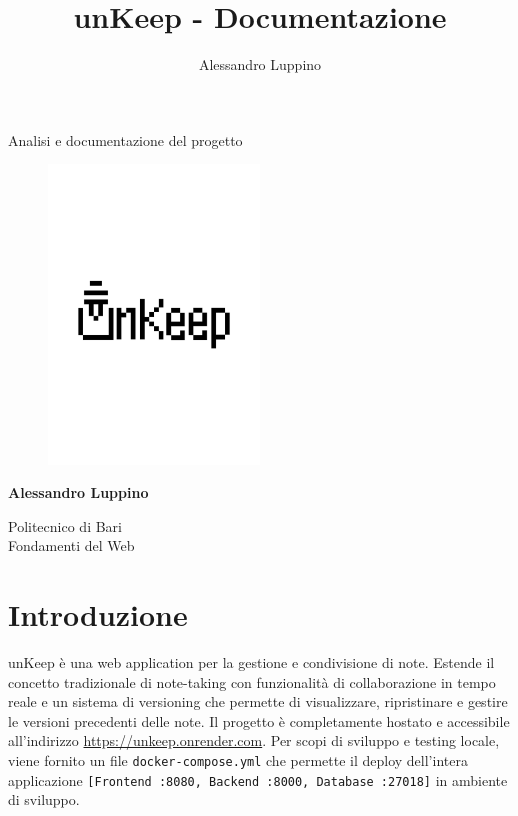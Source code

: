 \documentclass[11pt]{article}
\title{unKeep - Documentazione}
\author{Alessandro Luppino}
\begin{document}
\begin{titlepage}
   \begin{center}
       \vspace*{1cm}
       \vspace{0.5cm}
        {\huge Analisi e documentazione del progetto}
       \begin{figure}[H]
    		\centering
            \includegraphics[width=0.5\textwidth]{./Resources/unKeepLogo.png}
            \end{figure}
       \vspace{0.5cm}

       \textbf{Alessandro Luppino}

       \vfill
            
       Politecnico di Bari\\
       Fondamenti del Web
            
       \vspace{0.1cm}
   \end{center}
\end{titlepage}
\tableofcontents
\newpage
\section{Introduzione}
unKeep è una web application per la gestione e condivisione di note. Estende il concetto tradizionale di note-taking con funzionalità di collaborazione in tempo reale e un sistema di versioning che permette di visualizzare, ripristinare e gestire le versioni precedenti delle note.
Il progetto è completamente hostato e accessibile all'indirizzo \url{https://unkeep.onrender.com}. Per scopi di sviluppo e testing locale, viene fornito un file \texttt{docker-compose.yml} che permette il deploy dell'intera applicazione \texttt{[Frontend :8080, Backend :8000, Database :27018]} in ambiente di sviluppo.
\end{document}
